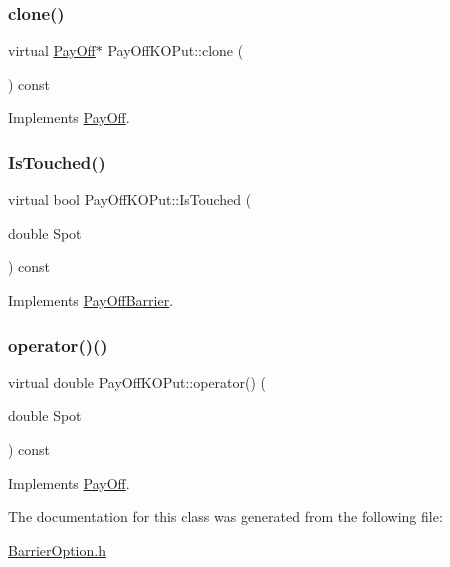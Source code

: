 \subsubsection{\texorpdfstring{clone()}{clone()}}
{\footnotesize\ttfamily virtual \hyperlink{classPayOff}{Pay\+Off}$\ast$ Pay\+Off\+K\+O\+Put\+::clone (\begin{DoxyParamCaption}{ }\end{DoxyParamCaption}) const\hspace{0.3cm}{\ttfamily [virtual]}}



Implements \hyperlink{classPayOff_ad8194d5b82247ae89c25c515f0ba806a}{Pay\+Off}.

\hypertarget{classPayOffKOPut_ad3237bb8f95b93cb2930b5c2a57fd7f8}{}\label{classPayOffKOPut_ad3237bb8f95b93cb2930b5c2a57fd7f8} 
\subsubsection{\texorpdfstring{Is\+Touched()}{IsTouched()}}
{\footnotesize\ttfamily virtual bool Pay\+Off\+K\+O\+Put\+::\+Is\+Touched (\begin{DoxyParamCaption}\item[{double}]{Spot }\end{DoxyParamCaption}) const\hspace{0.3cm}{\ttfamily [virtual]}}



Implements \hyperlink{classPayOffBarrier_a2aa9162c618c4f72a6593dc625e1e1e8}{Pay\+Off\+Barrier}.

\hypertarget{classPayOffKOPut_af773c102b127b0d58091d37a1d8737a0}{}\label{classPayOffKOPut_af773c102b127b0d58091d37a1d8737a0} 
\subsubsection{\texorpdfstring{operator()()}{operator()()}}
{\footnotesize\ttfamily virtual double Pay\+Off\+K\+O\+Put\+::operator() (\begin{DoxyParamCaption}\item[{double}]{Spot }\end{DoxyParamCaption}) const\hspace{0.3cm}{\ttfamily [virtual]}}



Implements \hyperlink{classPayOff_a5ae17d82c233ef5568c8fb0539703000}{Pay\+Off}.



The documentation for this class was generated from the following file\+:\begin{DoxyCompactItemize}
\item 
\hyperlink{BarrierOption_8h}{Barrier\+Option.\+h}\end{DoxyCompactItemize}
